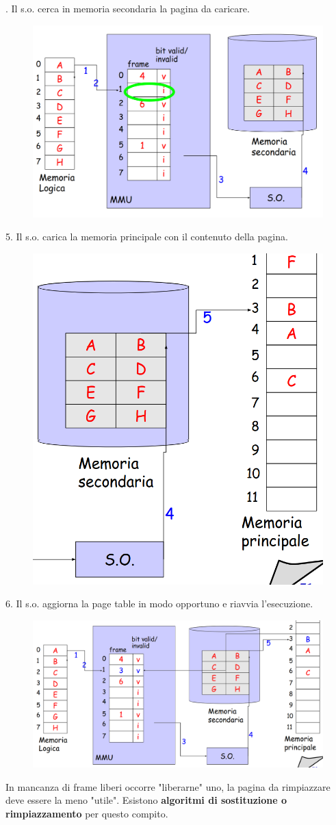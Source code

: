 . Il s.o. cerca in memoria secondaria la pagina da caricare.
    \begin{figure} [h]
        \centering
        \includegraphics[width=0.4\linewidth]{Images/Screenshot 2025-01-17 at 16-54-12 so-05-memoria - so-05-memoria.pdf.png}
    \end{figure}


5. Il s.o. carica la memoria principale con il contenuto della pagina.

    \begin{figure} [h]
        \centering
        \includegraphics[width=0.3\linewidth]{Images/Screenshot 2025-01-17 at 16-56-21 so-05-memoria - so-05-memoria.pdf.png}
    \end{figure}




6. Il s.o. aggiorna la page table in modo opportuno e riavvia l'esecuzione.

    \begin{figure} [h]
        \centering
        \includegraphics[width=0.6\linewidth]{Images/Screenshot 2025-01-17 at 16-57-37 so-05-memoria - so-05-memoria.pdf.png}
    \end{figure}


In mancanza di frame liberi occorre "liberarne" uno, la pagina da rimpiazzare deve essere la meno "utile".
Esistono \textbf{algoritmi di sostituzione o rimpiazzamento} per questo compito.

